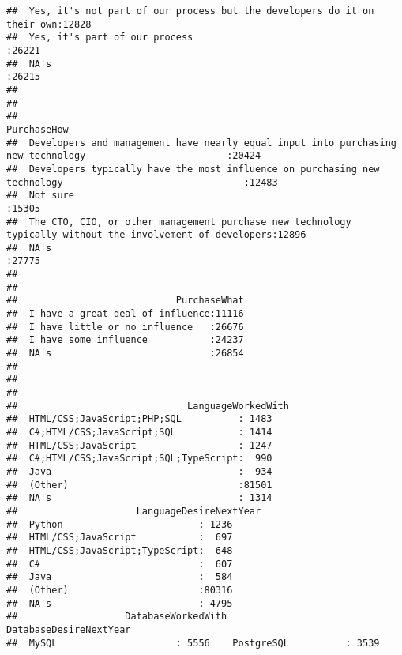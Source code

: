 \documentclass[]{article}
\begin{document}
\begin{verbatim}
##  Yes, it's not part of our process but the developers do it on their own:12828  
##  Yes, it's part of our process                                          :26221  
##  NA's                                                                   :26215  
##                                                                                 
##                                                                                 
##                                                                                                     PurchaseHow   
##  Developers and management have nearly equal input into purchasing new technology                         :20424  
##  Developers typically have the most influence on purchasing new technology                                :12483  
##  Not sure                                                                                                 :15305  
##  The CTO, CIO, or other management purchase new technology typically without the involvement of developers:12896  
##  NA's                                                                                                     :27775  
##                                                                                                                   
##                                                                                                                   
##                            PurchaseWhat  
##  I have a great deal of influence:11116  
##  I have little or no influence   :26676  
##  I have some influence           :24237  
##  NA's                            :26854  
##                                          
##                                          
##                                          
##                              LanguageWorkedWith
##  HTML/CSS;JavaScript;PHP;SQL          : 1483   
##  C#;HTML/CSS;JavaScript;SQL           : 1414   
##  HTML/CSS;JavaScript                  : 1247   
##  C#;HTML/CSS;JavaScript;SQL;TypeScript:  990   
##  Java                                 :  934   
##  (Other)                              :81501   
##  NA's                                 : 1314   
##                     LanguageDesireNextYear
##  Python                        : 1236     
##  HTML/CSS;JavaScript           :  697     
##  HTML/CSS;JavaScript;TypeScript:  648     
##  C#                            :  607     
##  Java                          :  584     
##  (Other)                       :80316     
##  NA's                          : 4795     
##                   DatabaseWorkedWith          DatabaseDesireNextYear
##  MySQL                     : 5556    PostgreSQL          : 3539     

\end{verbatim}
\end{document}
